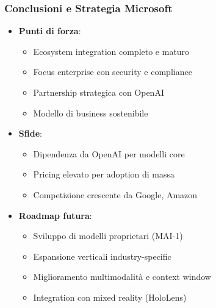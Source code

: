 \documentclass[aspectratio=169]{beamer}
\begin{document}
\begin{frame}
\frametitle{Conclusioni e Strategia Microsoft}
\begin{itemize}
    \item \textbf{Punti di forza}:
    \begin{itemize}
        \item Ecosystem integration completo e maturo
        \item Focus enterprise con security e compliance
        \item Partnership strategica con OpenAI
        \item Modello di business sostenibile
    \end{itemize}
    \item \textbf{Sfide}:
    \begin{itemize}
        \item Dipendenza da OpenAI per modelli core
        \item Pricing elevato per adoption di massa
        \item Competizione crescente da Google, Amazon
    \end{itemize}
    \item \textbf{Roadmap futura}:
    \begin{itemize}
        \item Sviluppo di modelli proprietari (MAI-1)
        \item Espansione verticali industry-specific
        \item Miglioramento multimodalità e context window
        \item Integration con mixed reality (HoloLens)
    \end{itemize}
\end{itemize}
\end{frame}
%
\end{document}
